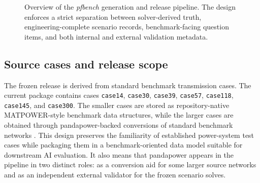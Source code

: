 \begin{figure}[!t]
\centering
{}
\caption{Overview of the \textit{pfbench} generation and release pipeline. The design enforces a strict separation between solver-derived truth, engineering-complete scenario records, benchmark-facing question items, and both internal and external validation metadata.}
\label{fig:pipeline}
\end{figure}

\subsection*{Source cases and release scope}

The frozen release is derived from standard benchmark transmission cases. The current package contains cases \texttt{case14}, \texttt{case30}, \texttt{case39}, \texttt{case57}, \texttt{case118}, \texttt{case145}, and \texttt{case300}. The smaller cases are stored as repository-native MATPOWER-style benchmark data structures, while the larger cases are obtained through pandapower-backed conversions of standard benchmark networks \cite{zimmerman2011matpower,thurner2018pandapower}. This design preserves the familiarity of established power-system test cases while packaging them in a benchmark-oriented data model suitable for downstream AI evaluation. It also means that pandapower appears in the pipeline in two distinct roles: as a conversion aid for some larger source networks and as an independent external validator for the frozen scenario solves.


